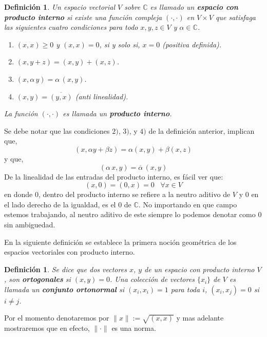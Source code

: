 \documentclass[12pt]{book}
\numberwithin{equation}{chapter}
\newtheorem{definition}[theorem]{Definici\'on}
\def\n{\noindent}
\def\C{\mathbb{C}}
\begin{document}
\begin{definition}
Un espacio vectorial $V$ sobre $\C$ es llamado un {\bf espacio con producto interno} si existe una funci\'on compleja $(\cdot,\cdot)$  en $V \times V$ que satisfaga las siguientes cuatro condiciones para todo $ x,y,z \in V $ y $\alpha \in \C$.
\begin{enumerate}
\item $(x,x) \geq 0$ y $ (x,x)=0 $, si y solo si, $x=0$ (positiva definida).
\item $(x,y+z)=(x,y)+(x,z)$.
\item $ ( x,\alpha \, y )= \alpha \, (x,y) $.
\item $ (x,y)= \overline{(y,x)} $ (anti linealidad).
\end{enumerate}
La funci\'on $ (\cdot,\cdot) $ es llamada un {\bf producto interno}.
\end{definition}
Se debe notar que las condiciones $2)$, $3)$, y $4)$ de la definici\'on anterior, implican que, 
$$ (x,\alpha y+\beta z)= \alpha (x,y) + \beta (x,z) $$ 
y que, 
$$ ( \alpha\, x,y )= \overline{\alpha}\, (x,y) $$
De la linealidad de las entradas del producto interno, es f\'acil ver que:
$$ (x,0)=(0,x)=0 \,\,\,\,\, \forall x \in V $$
en donde $0$, dentro del producto interno se refiere a la neutro aditivo de $V$ y $0$ en el lado derecho de la igualdad, es el $0$ de $\C$. No importando en que campo estemos trabajando, al neutro aditivo de este siempre lo podemos denotar como $0$ sin ambiguedad.

\n En la siguiente definici\'on se establece la primera noci\'on geom\'etrica de los espacios vectoriales con producto interno.

\begin{definition}
Se dice que dos vectores $x$, $y$ de un espacio con producto interno $V$, son {\bf ortogonales} si $(x,y)=0$. Una colecci\'on de vectores $\{x_{i}\}$ de $V$ es llamada un {\bf conjunto ortonormal} si $( x_{i},x_{i} )=1$ para toda $i$, $(x_{i},x_{j}) =0$ si $ i \neq j $.
\end{definition}

Por el momento denotaremos por $\|x\| := \sqrt{(x,x)}$ y mas adelante mostraremos que en efecto, $ \| \cdot \| $ es una norma.
\end{document}
